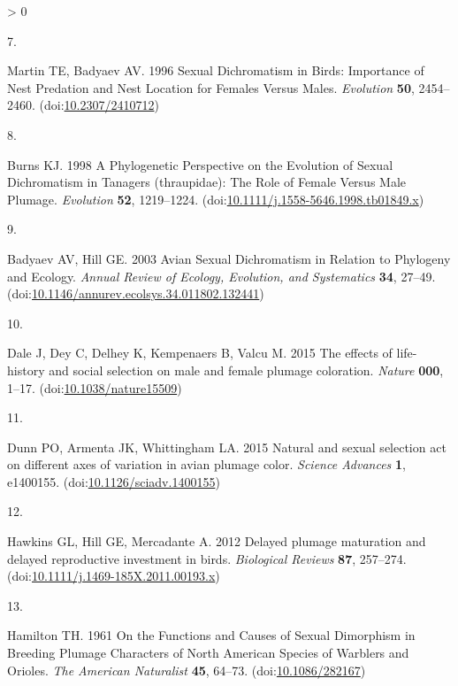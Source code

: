 \documentclass[
  a4paper,
]{article}
\newlength{\cslhangindent}
\newlength{\csllabelwidth}
\newenvironment{CSLReferences}[2] %
 {%
  \setlength{\parindent}{0pt}
  \ifodd #1 \everypar{\setlength{\hangindent}{\cslhangindent}}\ignorespaces\fi
  \ifnum #2 > 0
  \setlength{\parskip}{#2\baselineskip}
  \fi
 }%
 {}
\newcommand{\CSLLeftMargin}[1]{\parbox[t]{\csllabelwidth}{#1}}
\newcommand{\CSLRightInline}[1]{\parbox[t]{\linewidth - \csllabelwidth}{#1}\break}
\begin{document}
\begin{CSLReferences}{0}{0}
\leavevmode\hypertarget{ref-martin1996}{}%
\CSLLeftMargin{7. }
\CSLRightInline{Martin TE, Badyaev AV. 1996 Sexual {Dichromatism} in
{Birds}: {Importance} of {Nest Predation} and {Nest Location} for
{Females Versus Males}. \emph{Evolution} \textbf{50}, 2454--2460.
(doi:\href{https://doi.org/10.2307/2410712}{10.2307/2410712})}

\leavevmode\hypertarget{ref-burns1998}{}%
\CSLLeftMargin{8. }
\CSLRightInline{Burns KJ. 1998 A {Phylogenetic Perspective} on the
{Evolution} of {Sexual Dichromatism} in {Tanagers} (thraupidae): {The
Role} of {Female Versus Male Plumage}. \emph{Evolution} \textbf{52},
1219--1224.
(doi:\href{https://doi.org/10.1111/j.1558-5646.1998.tb01849.x}{10.1111/j.1558-5646.1998.tb01849.x})}

\leavevmode\hypertarget{ref-badyaev2003}{}%
\CSLLeftMargin{9. }
\CSLRightInline{Badyaev AV, Hill GE. 2003 Avian {Sexual Dichromatism} in
{Relation} to {Phylogeny} and {Ecology}. \emph{Annual Review of Ecology,
Evolution, and Systematics} \textbf{34}, 27--49.
(doi:\href{https://doi.org/10.1146/annurev.ecolsys.34.011802.132441}{10.1146/annurev.ecolsys.34.011802.132441})}

\leavevmode\hypertarget{ref-dale2015}{}%
\CSLLeftMargin{10. }
\CSLRightInline{Dale J, Dey C, Delhey K, Kempenaers B, Valcu M. 2015 The
effects of life-history and social selection on male and female plumage
coloration. \emph{Nature} \textbf{000}, 1--17.
(doi:\href{https://doi.org/10.1038/nature15509}{10.1038/nature15509})}

\leavevmode\hypertarget{ref-dunn2015}{}%
\CSLLeftMargin{11. }
\CSLRightInline{Dunn PO, Armenta JK, Whittingham LA. 2015 Natural and
sexual selection act on different axes of variation in avian plumage
color. \emph{Science Advances} \textbf{1}, e1400155.
(doi:\href{https://doi.org/10.1126/sciadv.1400155}{10.1126/sciadv.1400155})}

\leavevmode\hypertarget{ref-hawkins2012}{}%
\CSLLeftMargin{12. }
\CSLRightInline{Hawkins GL, Hill GE, Mercadante A. 2012 Delayed plumage
maturation and delayed reproductive investment in birds.
\emph{Biological Reviews} \textbf{87}, 257--274.
(doi:\href{https://doi.org/10.1111/j.1469-185X.2011.00193.x}{10.1111/j.1469-185X.2011.00193.x})}

\leavevmode\hypertarget{ref-hamilton1961}{}%
\CSLLeftMargin{13. }
\CSLRightInline{Hamilton TH. 1961 On the {Functions} and {Causes} of
{Sexual Dimorphism} in {Breeding Plumage Characters} of {North American
Species} of {Warblers} and {Orioles}. \emph{The American Naturalist}
\textbf{45}, 64--73.
(doi:\href{https://doi.org/10.1086/282167}{10.1086/282167})}


\end{CSLReferences}
\end{document}
